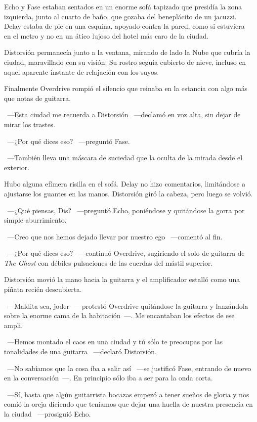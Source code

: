 Echo y Fase estaban sentados en un enorme sofá tapizado que presidía la zona izquierda, junto al cuarto de baño, que gozaba del beneplácito de un jacuzzi. Delay estaba de pie en una esquina, apoyado contra la pared, como si estuviera en el metro y no en un ático lujoso del hotel más caro de la ciudad.

Distorsión permanecía junto a la ventana, mirando de lado la Nube que cubría la ciudad, maravillado con su visión. Su rostro seguía cubierto de nieve, incluso en aquel aparente instante de relajación con los suyos.

Finalmente Overdrive rompió el silencio que reinaba en la estancia con algo más que notas de guitarra.

~---Esta ciudad me recuerda a Distorsión ~---declamó en voz alta, sin dejar de mirar los trastes.

~---¿Por qué dices eso? ~---preguntó Fase.

~---También lleva una máscara de suciedad que la oculta de la mirada desde el exterior.

Hubo alguna efímera risilla en el sofá. Delay no hizo comentarios, limitándose a ajustarse los guantes en las manos. Distorsión giró la cabeza, pero luego se volvió.

~---¿Qué piensas, Dis? ~---preguntó Echo, poniéndose y quitándose la gorra por simple aburrimiento.

~---Creo que nos hemos dejado llevar por nuestro ego ~---comentó al fin.

~---¿Por qué dices eso? ~---continuó Overdrive, sugiriendo el solo de guitarra de \emph{The Ghost} con débiles pulsaciones de las cuerdas del mástil superior.

Distorsión movió la mano hacia la guitarra y el amplificador estalló como una piñata recién descubierta.

~---Maldita sea, joder ~---protestó Overdrive quitándose la guitarra y lanzándola sobre la enorme cama de la habitación~---. Me encantaban los efectos de ese ampli.

~---Hemos montado el caos en una ciudad y tú sólo te preocupas por las tonalidades de una guitarra ~---declaró Distorsión.

~---No sabíamos que la cosa iba a salir así ~---se justificó Fase, entrando de nuevo en la conversación~---. En principio sólo iba a ser para la onda corta.

~---Sí, hasta que algún guitarrista bocazas empezó a tener sueños de gloria y nos comió la oreja diciendo que teníamos que dejar una huella de nuestra presencia en la ciudad ~---prosiguió Echo.

